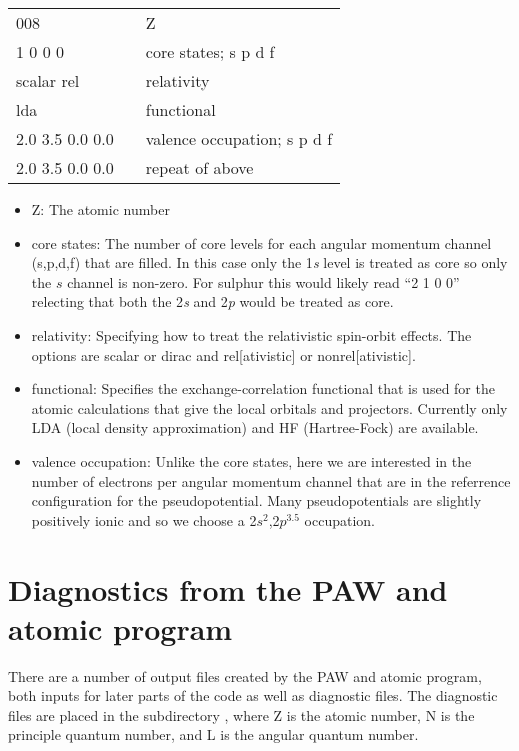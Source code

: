 \documentclass[11pt]{report}
\begin{document}
\begin{center}
\begin{tabular}{| l | c l |}
\hline
008				& &  Z\\
1 0 0 0			& & core states; s p d f \\
scalar rel			& & relativity \\
lda				& & functional \\
2.0 3.5 0.0 0.0		& & valence occupation; s p d f \\
2.0 3.5 0.0 0.0		& & repeat of above \\
\hline
\end{tabular}
\end{center}

\begin{itemize}
\item Z: The atomic number
\item core states: The number of core levels for each angular momentum channel (s,p,d,f) that are filled. In this case only the 1{\it s} level is treated as core so only the $s$ channel is non-zero. For sulphur this would likely read ``2 1 0 0'' relecting that both the 2{\it s} and 2{\it p} would be treated as core.
\item relativity: Specifying how to treat the relativistic spin-orbit effects. The options are scalar or dirac and rel[ativistic] or nonrel[ativistic].
\item functional: Specifies the exchange-correlation functional that is used for the atomic calculations that give the local orbitals and projectors. Currently only LDA (local density approximation) and HF (Hartree-Fock) are available.
\item valence occupation: Unlike the core states, here we are interested in the number of electrons per angular momentum channel that are in the referrence configuration for the pseudopotential. Many pseudopotentials are slightly positively ionic and so we choose a 2$s^2$,2$p^{3.5}$ occupation. 
\end{itemize}


\section{Diagnostics from the PAW and atomic program}
There are a number of output files created by the PAW and atomic program, both inputs for later parts of the code as well as diagnostic files. The diagnostic files are placed in the subdirectory , where Z is the atomic number, N is the principle quantum number, and L is the angular quantum number. 
\end{document}
